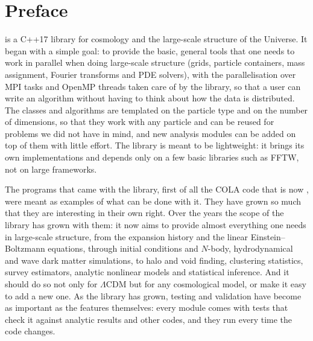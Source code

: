 \chapter*{Preface}

\fml{} is a C++17 library for cosmology and the large-scale structure of the Universe. It began with a simple goal:
to provide the basic, general tools that one needs to work in parallel when doing large-scale structure (grids,
particle containers, mass assignment, Fourier transforms and PDE solvers), with the parallelisation over MPI tasks and
OpenMP threads taken care of by the library, so that a user can write an algorithm without having to think about how
the data is distributed. The classes and algorithms are templated on the particle type and on the number of
dimensions, so that they work with any particle and can be reused for problems we did not have in mind, and new
analysis modules can be added on top of them with little effort. The library is meant to be lightweight: it brings
its own implementations and depends only on a few basic libraries such as FFTW, not on large frameworks.

The programs that came with the library, first of all the COLA code that is now , were meant as
examples of what can be done with it. They have grown so much that they are interesting in their own right. Over the
years the scope of the library has grown with them: it now aims to provide almost everything one needs in large-scale
structure, from the expansion history and the linear Einstein--Boltzmann equations, through initial conditions and
$N$-body, hydrodynamical and wave dark matter simulations, to halo and void finding, clustering statistics, survey
estimators, analytic nonlinear models and statistical inference. And it should do so not only for $\Lambda$CDM but for
any cosmological model, or make it easy to add a new one. As the library has grown, testing and validation have become
as important as the features themselves: every module comes with tests that check it against analytic results and
other codes, and they run every time the code changes.

